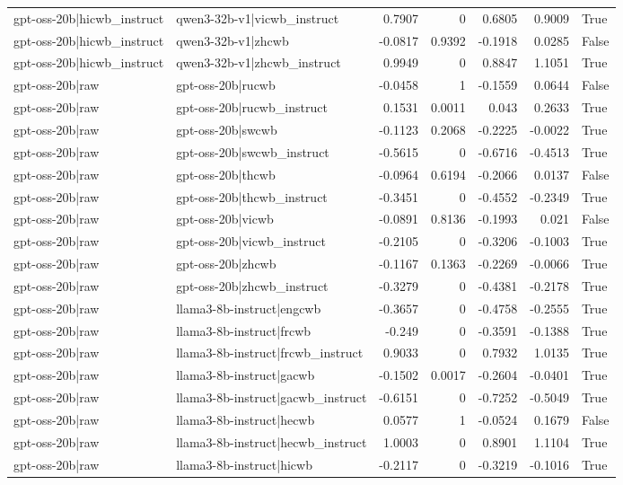 \begin{table}
\begin{tabular}{l l r r r r l}
gpt-oss-20b|hicwb_instruct & qwen3-32b-v1|vicwb_instruct & 0.7907 & 0 & 0.6805 & 0.9009 & True \\
gpt-oss-20b|hicwb_instruct & qwen3-32b-v1|zhcwb & -0.0817 & 0.9392 & -0.1918 & 0.0285 & False \\
gpt-oss-20b|hicwb_instruct & qwen3-32b-v1|zhcwb_instruct & 0.9949 & 0 & 0.8847 & 1.1051 & True \\
gpt-oss-20b|raw & gpt-oss-20b|rucwb & -0.0458 & 1 & -0.1559 & 0.0644 & False \\
gpt-oss-20b|raw & gpt-oss-20b|rucwb_instruct & 0.1531 & 0.0011 & 0.043 & 0.2633 & True \\
gpt-oss-20b|raw & gpt-oss-20b|swcwb & -0.1123 & 0.2068 & -0.2225 & -0.0022 & True \\
gpt-oss-20b|raw & gpt-oss-20b|swcwb_instruct & -0.5615 & 0 & -0.6716 & -0.4513 & True \\
gpt-oss-20b|raw & gpt-oss-20b|thcwb & -0.0964 & 0.6194 & -0.2066 & 0.0137 & False \\
gpt-oss-20b|raw & gpt-oss-20b|thcwb_instruct & -0.3451 & 0 & -0.4552 & -0.2349 & True \\
gpt-oss-20b|raw & gpt-oss-20b|vicwb & -0.0891 & 0.8136 & -0.1993 & 0.021 & False \\
gpt-oss-20b|raw & gpt-oss-20b|vicwb_instruct & -0.2105 & 0 & -0.3206 & -0.1003 & True \\
gpt-oss-20b|raw & gpt-oss-20b|zhcwb & -0.1167 & 0.1363 & -0.2269 & -0.0066 & True \\
gpt-oss-20b|raw & gpt-oss-20b|zhcwb_instruct & -0.3279 & 0 & -0.4381 & -0.2178 & True \\
gpt-oss-20b|raw & llama3-8b-instruct|engcwb & -0.3657 & 0 & -0.4758 & -0.2555 & True \\
gpt-oss-20b|raw & llama3-8b-instruct|frcwb & -0.249 & 0 & -0.3591 & -0.1388 & True \\
gpt-oss-20b|raw & llama3-8b-instruct|frcwb_instruct & 0.9033 & 0 & 0.7932 & 1.0135 & True \\
gpt-oss-20b|raw & llama3-8b-instruct|gacwb & -0.1502 & 0.0017 & -0.2604 & -0.0401 & True \\
gpt-oss-20b|raw & llama3-8b-instruct|gacwb_instruct & -0.6151 & 0 & -0.7252 & -0.5049 & True \\
gpt-oss-20b|raw & llama3-8b-instruct|hecwb & 0.0577 & 1 & -0.0524 & 0.1679 & False \\
gpt-oss-20b|raw & llama3-8b-instruct|hecwb_instruct & 1.0003 & 0 & 0.8901 & 1.1104 & True \\
gpt-oss-20b|raw & llama3-8b-instruct|hicwb & -0.2117 & 0 & -0.3219 & -0.1016 & True \\

\end{tabular}
\end{table}

